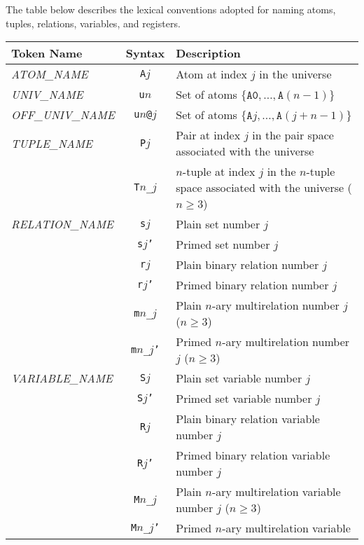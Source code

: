 \documentclass[a4paper,12pt]{article}
\begin{document}
The table below describes the lexical conventions adopted for naming atoms,
tuples, relations, variables, and registers.

\begin{center}
\small
\begin{supertabular}{l|c|p{89mm}} %
Token Name & Syntax & Description \\[.4ex]
\hline
\strut{}%
\textit{ATOM\_NAME} & \texttt{A}$j$ & Atom at index $j$ in the universe\bigstrut \\
\textit{UNIV\_NAME} & \texttt{u}$n$ & Set of atoms $\{\texttt{A0}, \ldots, \texttt{A}(n - 1)\}$\bigstrut \\
\textit{OFF\_UNIV\_NAME} & \texttt{u}$n$\texttt{@}$j$ & Set of atoms $\{\texttt{A}j, \ldots, \texttt{A}(j + n - 1)\}$\bigstrut \\
\bigstrut\textit{TUPLE\_NAME} & \texttt{P}$j$ & Pair at index $j$ in the pair space associated with the universe\bigstrut \\
\bigstrut & \texttt{T}$n$\texttt{\_}$j$ & $n$-tuple at index $j$ in the $n$-tuple space
associated with the universe ($n \ge 3$)\bigstrut \\
\textit{RELATION\_NAME} & \texttt{s}$j$ & Plain set number $j$\bigstrut \\
& \texttt{s}$j$\texttt{'} & Primed set number $j$\bigstrut \\
& \texttt{r}$j$ & Plain binary relation number $j$\bigstrut \\
& \texttt{r}$j$\texttt{'} & Primed binary relation number $j$\bigstrut \\
& \texttt{m}$n$\texttt{\_}$j$ & Plain $n$-ary multirelation number $j$ ($n \ge 3$)\bigstrut \\
& \texttt{m}$n$\texttt{\_}$j$\texttt{'} & Primed $n$-ary multirelation number $j$ ($n \ge 3$)\bigstrut \\
\textit{VARIABLE\_NAME} & \texttt{S}$j$ & Plain set variable number $j$\bigstrut \\
& \texttt{S}$j$\texttt{'} & Primed set variable number $j$\bigstrut \\
& \texttt{R}$j$ & Plain binary relation variable number $j$\bigstrut \\
& \texttt{R}$j$\texttt{'} & Primed binary relation variable number $j$\bigstrut \\
\bigstrut & \texttt{M}$n$\texttt{\_}$j$ &Plain $n$-ary multirelation variable number
$j$ ($n \ge 3$)\bigstrut \\
\bigstrut & \texttt{M}$n$\texttt{\_}$j$\texttt{'} & Primed $n$-ary multirelation variable 

\end{supertabular}
\end{center}
\end{document}
